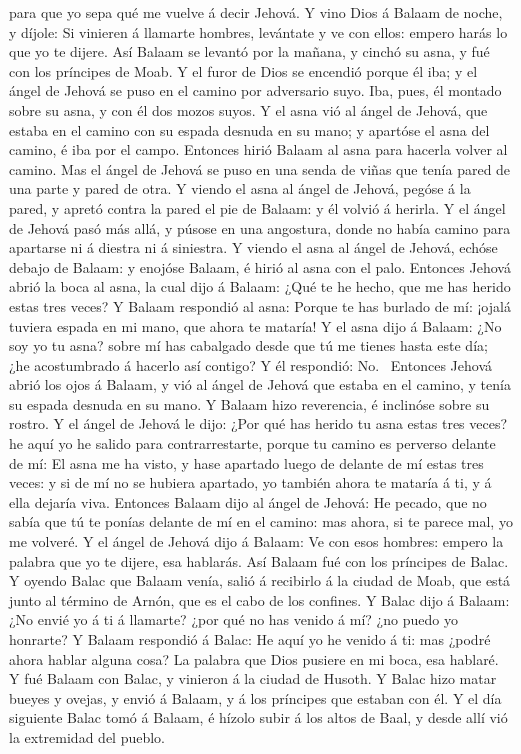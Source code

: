 para que yo sepa qué me vuelve á decir Jehová.  Y vino Dios
á Balaam de noche, y díjole: Si vinieren á llamarte hombres, levántate y
ve con ellos: empero harás lo que yo te dijere.  Así Balaam
se levantó por la mañana, y cinchó su asna, y fué con los príncipes de
Moab.  Y el furor de Dios se encendió porque él iba; y el
ángel de Jehová se puso en el camino por adversario suyo. Iba, pues, él
montado sobre su asna, y con él dos mozos suyos.  Y el asna
vió al ángel de Jehová, que estaba en el camino con su espada desnuda en
su mano; y apartóse el asna del camino, é iba por el campo. Entonces
hirió Balaam al asna para hacerla volver al camino.  Mas el
ángel de Jehová se puso en una senda de viñas que tenía pared de una
parte y pared de otra.  Y viendo el asna al ángel de
Jehová, pegóse á la pared, y apretó contra la pared el pie de Balaam: y
él volvió á herirla.  Y el ángel de Jehová pasó más allá, y
púsose en una angostura, donde no había camino para apartarse ni á
diestra ni á siniestra.  Y viendo el asna al ángel de
Jehová, echóse debajo de Balaam: y enojóse Balaam, é hirió al asna con
el palo.  Entonces Jehová abrió la boca al asna, la cual
dijo á Balaam: ¿Qué te he hecho, que me has herido estas tres veces?
 Y Balaam respondió al asna: Porque te has burlado de mí:
¡ojalá tuviera espada en mi mano, que ahora te mataría!  Y
el asna dijo á Balaam: ¿No soy yo tu asna? sobre mí has cabalgado desde
que tú me tienes hasta este día; ¿he acostumbrado á hacerlo así contigo?
Y él respondió: No.~ Entonces Jehová abrió los ojos á
Balaam, y vió al ángel de Jehová que estaba en el camino, y tenía su
espada desnuda en su mano. Y Balaam hizo reverencia, é inclinóse sobre
su rostro.  Y el ángel de Jehová le dijo: ¿Por qué has
herido tu asna estas tres veces? he aquí yo he salido para
contrarrestarte, porque tu camino es perverso delante de mí:
 El asna me ha visto, y hase apartado luego de delante de
mí estas tres veces: y si de mí no se hubiera apartado, yo también ahora
te mataría á ti, y á ella dejaría viva.  Entonces Balaam
dijo al ángel de Jehová: He pecado, que no sabía que tú te ponías
delante de mí en el camino: mas ahora, si te parece mal, yo me volveré.
 Y el ángel de Jehová dijo á Balaam: Ve con esos hombres:
empero la palabra que yo te dijere, esa hablarás. Así Balaam fué con los
príncipes de Balac.  Y oyendo Balac que Balaam venía, salió
á recibirlo á la ciudad de Moab, que está junto al término de Arnón, que
es el cabo de los confines.  Y Balac dijo á Balaam: ¿No
envié yo á ti á llamarte? ¿por qué no has venido á mí? ¿no puedo yo
honrarte?  Y Balaam respondió á Balac: He aquí yo he venido
á ti: mas ¿podré ahora hablar alguna cosa? La palabra que Dios pusiere
en mi boca, esa hablaré.  Y fué Balaam con Balac, y
vinieron á la ciudad de Husoth.  Y Balac hizo matar bueyes
y ovejas, y envió á Balaam, y á los príncipes que estaban con él.
 Y el día siguiente Balac tomó á Balaam, é hízolo subir á
los altos de Baal, y desde allí vió la extremidad del pueblo.

